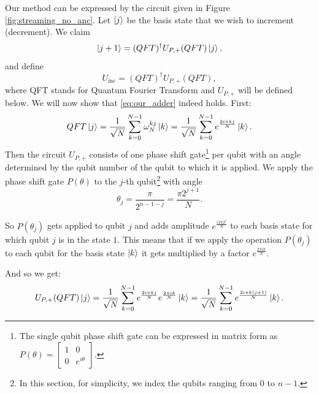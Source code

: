 Our method can be expressed by the circuit given in Figure \ref{fig:streaming_no_anc}. 
Let $\ket{j}$ be the basis state that we wish to increment (decrement). We claim
\begin{equation} \label{eq:our_adder}
    \ket{j+1} = (QFT)^\dagger U_{P,+} (QFT) \ket{j},
\end{equation} and define 
\begin{equation} \label{eq:def our_adder}
    U_\text{inc}= (QFT)^\dagger U_{P,+} (QFT),
\end{equation} where QFT stands for Quantum Fourier Transform and $U_{P,+}$ will be defined below.
We will now show that \eqref{eq:our_adder} indeed holds. First: 
\begin{equation}
    QFT \ket{j} = \frac{1}{\sqrt{N}}\sum_{k=0}^{N-1} \omega_N^{kj}\ket{k} = \frac{1}{\sqrt{N}} \sum_{k=0}^{N-1} e^{\frac{2 i \pi k j}{N}}\ket{k}.
\end{equation}
Then the circuit $U_{P,+}$ consists of one phase shift gate\footnote{The single qubit phase shift gate can be expressed in matrix form as $P\left ( \theta \right ) = \begin{bmatrix}1 & 0 \\ 0 & e^{i\theta} \end{bmatrix}$.  } per qubit with an angle determined by the qubit number of the qubit to which it is applied. We apply the phase shift gate $P(\theta)$ to the $j$-th qubit\footnote{In this section, for simplicity, we index the qubits ranging from 0 to $n-1$.} with angle
\begin{equation}\label{eq:theta_i}
    \theta_j=\frac{\pi}{2^{n-1-j}} =\frac{\pi 2^{j+1}}{N}.
\end{equation}

So $P(\theta_j)$ gets applied to qubit $j$ and adds amplitude $e^{\frac{i2\pi 2^j}{N}}$ to each basis state for which qubit $j$ is in the state $1$. This means that if we apply the operation $P(\theta_j)$ to each qubit for the basis state $\ket{k}$ it gets multiplied by a factor $e^{\frac{2\pi i k}{N}}$. 

And so we get: 
\begin{equation}
    U_{P,+} (QFT) \ket{j} = \frac{1}{\sqrt{N}} \sum_{k=0}^{N-1} e^{\frac{2 i \pi k j}{N}}e^{\frac{2\pi i k}{N}} \ket{k} = \frac{1}{\sqrt{N}} \sum_{k=0}^{N-1} e^{\frac{2 i \pi k (j+1)}{N}}\ket{k} .
\end{equation}

